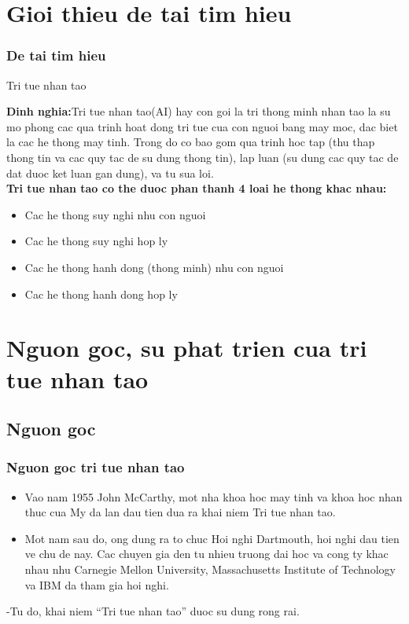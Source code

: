\documentclass[12pt]{beamer}
\begin{document}
\section{Gioi thieu de tai tim hieu}

\begin{frame}

\frametitle{De tai tim hieu}
\begin{block}{\centerline{Tri tue nhan tao}}
\textbf{Dinh nghia:}Tri tue nhan tao(AI) hay con goi la tri thong minh nhan tao la su mo phong cac qua trinh hoat dong tri tue cua con nguoi bang may moc, dac biet la cac he thong may tinh. Trong do co bao gom qua trinh hoc tap (thu thap thong tin va cac quy tac de su dung thong tin), lap luan (su dung cac quy tac de dat duoc ket luan gan dung), va tu sua loi. \\

\textbf{Tri tue nhan tao co the duoc phan thanh 4 loai he thong khac nhau:} 
\begin{itemize}
\item Cac he thong suy nghi nhu con nguoi
\item  Cac he thong suy nghi hop ly
\item Cac he thong hanh dong (thong minh) nhu con nguoi
\item Cac he thong hanh dong hop ly
\end{itemize}
\end{block}
\end{frame}
\section{Nguon goc, su phat trien cua tri tue nhan tao}
\subsection{Nguon goc}
\begin{frame}
\frametitle{Nguon goc tri tue nhan tao}
\begin{itemize}
\item{Vao nam 1955 John McCarthy, mot nha khoa hoc may tinh va khoa hoc nhan thuc cua My da lan dau tien dua ra khai niem Tri tue nhan tao.} 
\item{Mot nam sau do, ong dung ra to chuc Hoi nghi Dartmouth, hoi nghi dau tien ve chu de nay. Cac chuyen gia den tu nhieu truong dai hoc va cong ty khac nhau nhu Carnegie Mellon University, Massachusetts Institute of Technology va IBM da tham gia hoi nghi.}
\end{itemize}
     -Tu do, khai niem “Tri tue nhan tao” duoc su dung rong rai.
\end{frame}
\end{document}
